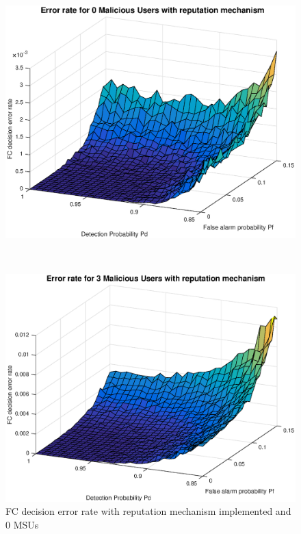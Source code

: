 \documentclass[letterpaper, 10 pt, conference]{ieeeconf}  %
\begin{document}
    \begin{figure}[t]
    \centering
    \begin{minipage}[t]{0.32 \textwidth}
     \includegraphics[width=\linewidth]{figures/rm0mu.eps}
\caption{FC decision error rate with reputation mechanism implemented and 0 MSUs}\label{rm0}
    \end{minipage}%
    ~ 
    \begin{minipage}[t]{0.32\textwidth}
        \centering
        \includegraphics[width=\linewidth]{figures/rm3mu.eps}

\end{minipage}
\end{figure}
\end{document}
